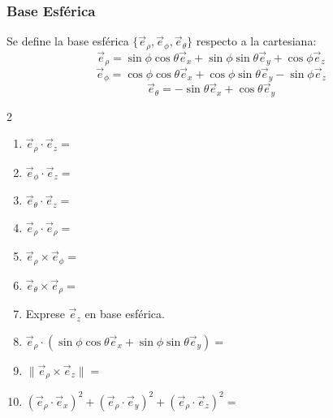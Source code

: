 \subsubsection{Base Esférica}
Se define la base esférica $\{\vec{e}_\rho, \vec{e}_\phi, \vec{e}_\theta\}$ respecto a la cartesiana:
$$\vec{e}_\rho = \sin\phi\cos\theta\vec{e}_x + \sin\phi\sin\theta\vec{e}_y + \cos\phi\vec{e}_z$$
$$\vec{e}_\phi = \cos\phi\cos\theta\vec{e}_x + \cos\phi\sin\theta\vec{e}_y - \sin\phi\vec{e}_z$$
$$\vec{e}_\theta = -\sin\theta\vec{e}_x + \cos\theta\vec{e}_y$$

\begin{multicols}{2}
\begin{enumerate}
    \item $\vec{e}_\rho \cdot \vec{e}_z =$
    \item $\vec{e}_\phi \cdot \vec{e}_z =$
    \item $\vec{e}_\theta \cdot \vec{e}_z =$
    \item $\vec{e}_\rho \cdot \vec{e}_\rho =$
    \item $\vec{e}_\rho \times \vec{e}_\phi =$
    \item $\vec{e}_\theta \times \vec{e}_\rho =$
    \item Exprese $\vec{e}_z$ en base esférica.
    \item $\vec{e}_\rho \cdot (\sin\phi\cos\theta\vec{e}_x + \sin\phi\sin\theta\vec{e}_y) =$
    \item $\| \vec{e}_\rho \times \vec{e}_z \| =$
    \item $(\vec{e}_\rho \cdot \vec{e}_x)^2 + (\vec{e}_\rho \cdot \vec{e}_y)^2 + (\vec{e}_\rho \cdot \vec{e}_z)^2 =$
\end{enumerate}
\end{multicols}
